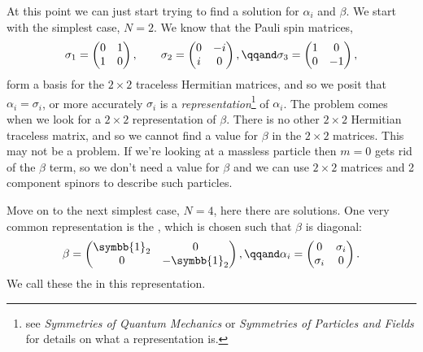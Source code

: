 \documentclass[fleqn]{NotesClass}
\newcommand*{\course}[1]{\textit{#1}}
\newcommand{\ident}{\symbb{1}}
\begin{document}
    At this point we can just start trying to find a solution for \(\alpha_i\) and \(\beta\).
    We start with the simplest case, \(N = 2\).
    We know that the Pauli spin matrices,
    \begin{equation}
        \sigma_1 = 
        \begin{pmatrix}
            0 & 1\\
            1 & 0
        \end{pmatrix}
        , \qquad \sigma_2 = 
        \begin{pmatrix}
            0 & -i\\
            i & 0
        \end{pmatrix}
        , \qqand \sigma_3 = 
        \begin{pmatrix}
            1 & 0\\
            0 & -1
        \end{pmatrix}
        ,
    \end{equation}
    form a basis for the \(2 \times 2\) traceless Hermitian matrices, and so we posit that \(\alpha_i = \sigma_i\), or more accurately \(\sigma_i\) is a \emph{representation}\footnote{see \course{Symmetries of Quantum Mechanics} or \course{Symmetries of Particles and Fields} for details on what a representation is.} of \(\alpha_i\).
    The problem comes when we look for a \(2\times 2\) representation of \(\beta\).
    There is no other \(2\times 2\) Hermitian traceless matrix, and so we cannot find a value for \(\beta\) in the \(2\times 2\) matrices.
    This may not be a problem.
    If we're looking at a massless particle then \(m = 0\) gets rid of the \(\beta\) term, so we don't need a value for \(\beta\) and we can use \(2 \times 2\) matrices and 2 component spinors to describe such particles.
    
    Move on to the next simplest case, \(N = 4\), here there are solutions.
    One very common representation is the , which is chosen such that \(\beta\) is diagonal:
    \begin{equation}
        \beta = 
        \begin{pmatrix}
            \ident_2 & 0\\
            0 & -\ident_2
        \end{pmatrix}
        , \qqand \alpha_i = 
        \begin{pmatrix}
            0 & \sigma_i\\
            \sigma_i & 0
        \end{pmatrix}
        .
    \end{equation}
    We call these the  in this representation.
    
\end{document}
